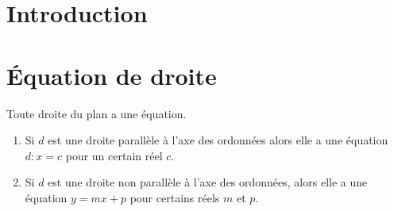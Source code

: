
\section*{Introduction}



\section{Équation de droite}

\begin{theorem}
    Toute droite du plan a une équation.
    \begin{enumerate}
        \item
            Si \( d\) est une droite parallèle à l'axe des ordonnées alors elle a une équation \( d:x=c\) pour un certain réel \( c\).
        \item
            Si \( d\) est une droite non parallèle à l'axe des ordonnées, alors elle a une équation \( y=mx+p\) pour certains réels \( m\) et \( p\).
    \end{enumerate}
\end{theorem}

